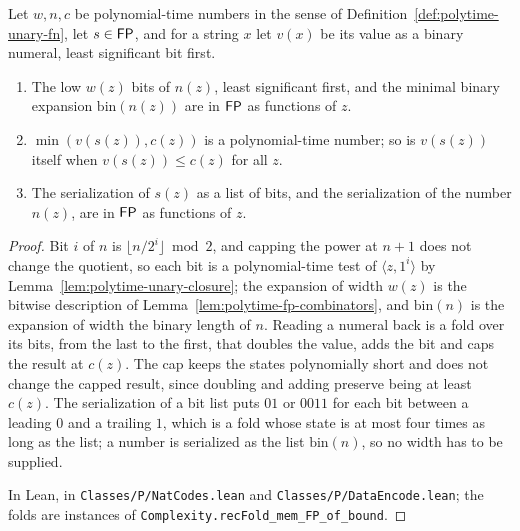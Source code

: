 \begin{lemma}
  \label{lem:polytime-binary-codes}
  \leanok
  Let $w, n, c$ be polynomial-time numbers in the sense of
  Definition~\ref{def:polytime-unary-fn}, let $s \in \mathsf{FP}$, and for a
  string $x$ let $v(x)$ be its value as a binary numeral, least significant
  bit first.
  \begin{enumerate}
    \item The low $w(z)$ bits of $n(z)$, least significant first, and the
      minimal binary expansion $\mathrm{bin}(n(z))$ are in $\mathsf{FP}$ as
      functions of $z$.
    \item $\min(v(s(z)), c(z))$ is a polynomial-time number; so is
      $v(s(z))$ itself when $v(s(z)) \le c(z)$ for all $z$.
    \item The serialization of $s(z)$ as a list of bits, and the
      serialization of the number $n(z)$, are in $\mathsf{FP}$ as functions of
      $z$.
  \end{enumerate}
\end{lemma}
\begin{proof}
  \leanok
  Bit $i$ of $n$ is $\lfloor n / 2^i \rfloor \bmod 2$, and capping the power
  at $n + 1$ does not change the quotient, so each bit is a polynomial-time
  test of $\langle z, 1^i \rangle$ by Lemma~\ref{lem:polytime-unary-closure};
  the expansion of width $w(z)$ is the bitwise description of
  Lemma~\ref{lem:polytime-fp-combinators}, and $\mathrm{bin}(n)$ is the
  expansion of width the binary length of $n$. Reading a numeral back is a
  fold over its bits, from the last to the first, that doubles the value,
  adds the bit and caps the result at $c(z)$. The cap keeps the states
  polynomially short and does not change the capped result, since doubling
  and adding preserve being at least $c(z)$. The serialization of a bit list
  puts $01$ or $0011$ for each bit between a leading $0$ and a trailing $1$,
  which is a fold whose state is at most four times as long as the list; a
  number is serialized as the list $\mathrm{bin}(n)$, so no width has to be
  supplied.

  In Lean, in \texttt{Classes/P/NatCodes.lean} and
  \texttt{Classes/P/DataEncode.lean}; the folds are instances of
  \texttt{Complexity.recFold\_mem\_FP\_of\_bound}.
\end{proof}

